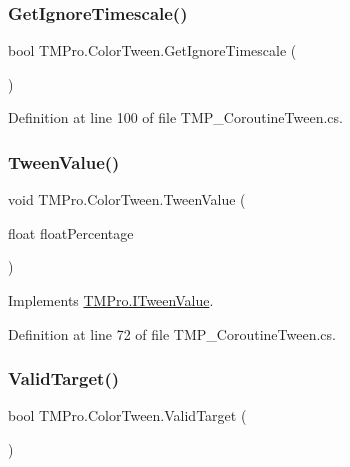 \subsubsection{\texorpdfstring{GetIgnoreTimescale()}{GetIgnoreTimescale()}}
{\footnotesize\ttfamily bool T\+M\+Pro.\+Color\+Tween.\+Get\+Ignore\+Timescale (\begin{DoxyParamCaption}{ }\end{DoxyParamCaption})}



Definition at line 100 of file T\+M\+P\+\_\+\+Coroutine\+Tween.\+cs.

\mbox{\label{struct_t_m_pro_1_1_color_tween_aa2ab2acdd602a7f7c73c179d4b0b92f5}} 
\subsubsection{\texorpdfstring{TweenValue()}{TweenValue()}}
{\footnotesize\ttfamily void T\+M\+Pro.\+Color\+Tween.\+Tween\+Value (\begin{DoxyParamCaption}\item[{float}]{float\+Percentage }\end{DoxyParamCaption})}



Implements \mbox{\hyperlink{interface_t_m_pro_1_1_i_tween_value_aed9322f3d92691a29267b72c104b40bf}{T\+M\+Pro.\+I\+Tween\+Value}}.



Definition at line 72 of file T\+M\+P\+\_\+\+Coroutine\+Tween.\+cs.

\mbox{\label{struct_t_m_pro_1_1_color_tween_adab4fef0982d1c37120c45baa1bf1111}} 
\subsubsection{\texorpdfstring{ValidTarget()}{ValidTarget()}}
{\footnotesize\ttfamily bool T\+M\+Pro.\+Color\+Tween.\+Valid\+Target (\begin{DoxyParamCaption}{ }\end{DoxyParamCaption})}



